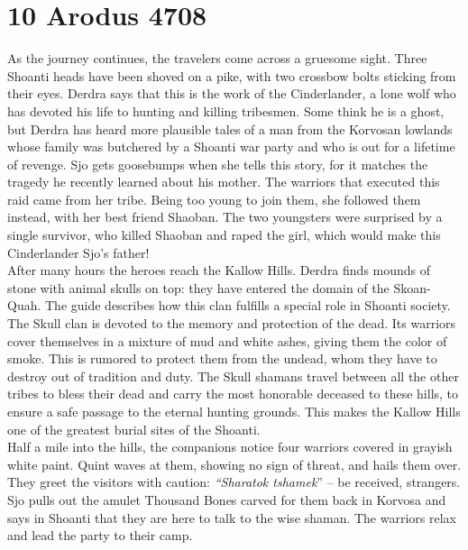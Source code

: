 \section{10 Arodus 4708}

As the journey continues, the travelers come across a gruesome sight. Three Shoanti heads have been shoved on a pike, with two crossbow bolts sticking from their eyes. Derdra says that this is the work of the Cinderlander, a lone wolf who has devoted his life to hunting and killing tribesmen. Some think he is a ghost, but Derdra has heard more plausible tales of a man from the Korvosan lowlands whose family was butchered by a Shoanti war party and who is out for a lifetime of revenge. Sjo gets goosebumps when she tells this story, for it matches the tragedy he recently learned about his mother. The warriors that executed this raid came from her tribe. Being too young to join them, she followed them instead, with her best friend Shaoban. The two youngsters were surprised by a single survivor, who killed Shaoban and raped the girl, which would make this Cinderlander Sjo's father!\\

After many hours the heroes reach the Kallow Hills. Derdra finds mounds of stone with animal skulls on top: they have entered the domain of the Skoan-Quah. The guide describes how this clan fulfills a special role in Shoanti society. The Skull clan is devoted to the memory and protection of the dead. Its warriors cover themselves in a mixture of mud and white ashes, giving them the color of smoke. This is rumored to protect them from the undead, whom they have to destroy out of tradition and duty. The Skull shamans travel between all the other tribes to bless their dead and carry the most honorable deceased to these hills, to ensure a safe passage to the eternal hunting grounds. This makes the Kallow Hills one of the greatest burial sites of the Shoanti.\\

Half a mile into the hills, the companions notice four warriors covered in grayish white paint. Quint waves at them, showing no sign of threat, and hails them over. They greet the visitors with caution: {\itshape``Sharatok tshamek}'' -- be received, strangers. Sjo pulls out the amulet Thousand Bones carved for them back in Korvosa and says in Shoanti that they are here to talk to the wise shaman. The warriors relax and lead the party to their camp.\\

